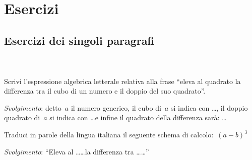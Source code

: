 
\section{Esercizi}

\subsection{Esercizi dei singoli paragrafi}


\subsubsection*{}

\begin{esercizio}
\label{ese:8.1}
~

\end{esercizio}

\begin{esercizio}
\label{ese:8.2}
Scrivi l'espressione algebrica letterale relativa alla frase ``eleva al 
quadrato la differenza tra il cubo di un numero e il doppio del suo 
quadrato''.

\emph{Svolgimento}: detto~\(a\) il numero generico, il cubo di~\(a\) si 
indica con \ldots, il doppio quadrato di~\(a\) si indica con \ldots e 
infine il quadrato della differenza sarà: \ldots
\end{esercizio}

\begin{esercizio}
\label{ese:8.3}
Traduci in parole della lingua italiana il seguente schema di 
calcolo:~\((a-b)^{3}\)

\emph{Svolgimento}: 
``Eleva al \ldots\ldots la differenza tra \ldots\ldots''
\end{esercizio}

